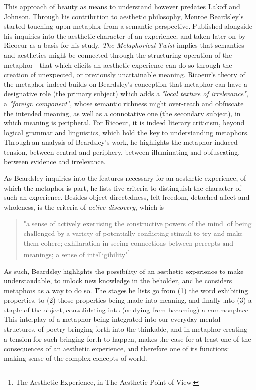 \documentclass{article}
\begin{document}
This approach of beauty as means to understand however predates Lakoff and Johnson. Through his contribution to aesthetic philosophy, Monroe Beardsley's started touching upon metaphor from a semantic perspective. Published alongside his inquiries into the aesthetic character of an experience, and taken later on by Ricoeur as a basis for his study, \emph{The Metaphorical Twist} implies that semantics and aesthetics might be connected through the structuring operation of the metaphor—that which elicits an aesthetic experience can do so through the creation of unexpected, or previously unattainable meaning. Ricoeur's theory of the metaphor indeed builds on Beardsley's conception that metaphor can have a designative role (the primary subject) which adds a \emph{"local texture of irrelevance"}, a \emph{"foreign component"}, whose semantic richness might over-reach and obfuscate the intended meaning, as well as a connotative one (the secondary subject), in which meaning is peripheral. For Ricoeur, it is indeed literary criticism, beyond logical grammar and linguistics, which hold the key to understanding metaphors. Through an analysis of Beardsley's work, he highlights the metaphor-induced tension, between central and periphery, between illuminating and obfuscating, between evidence and irrelevance.

As Beardsley inquiries into the features necessary for an aesthetic experience, of which the metaphor is part, he lists five criteria to distinguish the character of such an experience. Besides object-directedness, felt-freedom, detached-affect and wholeness, is the criteria of \emph{active discovery}, which is

\begin{quote}
  "a sense of actively exercising the constructive powers of the mind, of being challenged by a variety of potentially conflicting stimuli to try and make them cohere; exhilaration in seeing connections between percepts and meanings; a sense of intelligibility"\footnote{The Aesthetic Experience, in The Aesthetic Point of View\cite{beardsley_aesthetic_1970}.}
\end{quote}

As such, Beardsley highlights the possibility of an aesthetic experience to make understandable, to unlock new knowledge in the beholder, and he considers metaphors as a way to do so. The stages he lists go from (1) the word exhibiting properties, to (2) those properties being made into meaning, and finally into (3) a staple of the object, consolidating into (or dying from becoming) a commonplace. This interplay of a metaphor being integrated into our everyday mental structures, of poetry bringing forth into the thinkable, and in metaphor creating a tension for such bringing-forth to happen, makes the case for at least one of the consequences of an aesthetic experience, and therefore one of its functions: making sense of the complex concepts of world.
\end{document}
